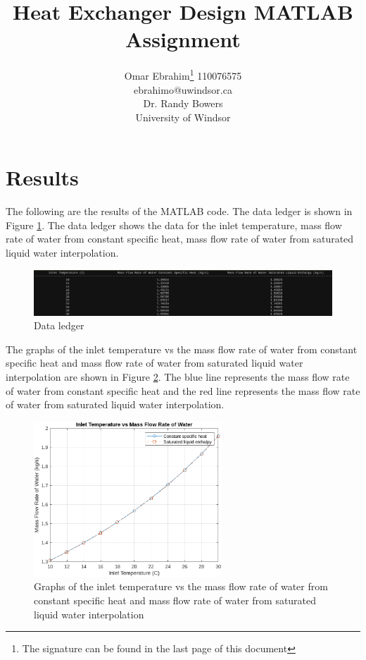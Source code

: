 \documentclass[12pt, titlepage]{article}
\title{Heat Exchanger Design MATLAB Assignment}
\author{Omar Ebrahim\footnote{The signature can be found in the last page of
this document} 110076575\\ebrahimo@uwindsor.ca\\Dr. Randy Bowers\\ University
of Windsor}
\begin{document}
\maketitle
\tableofcontents
\listoffigures
\newpage
\section{Results}
The following are the results of the MATLAB code. The data ledger is shown in
Figure \ref{fig:ledger}. The data ledger shows the data for the inlet temperature,
mass flow rate of water from constant specific heat, mass flow rate of water from
saturated liquid water interpolation.
\begin{figure}[H]
  \centering
  \includegraphics[width=1\textwidth]{../data_ledger.png}
  \caption{Data ledger}
  \label{fig:ledger}
\end{figure}
The graphs of the inlet temperature vs the mass flow rate of water from constant
specific heat and mass flow rate of water from saturated liquid water interpolation
are shown in Figure \ref{fig:graphs}. The blue line represents the mass flow rate
of water from constant specific heat and the red line represents the mass flow
rate of water from saturated liquid water interpolation.
\begin{figure}[H]
  \centering
  \includegraphics[width=0.63\textwidth]{../graph.png}
  \caption{Graphs of the inlet temperature vs the mass flow rate of water from
  constant specific heat and mass flow rate of water from saturated liquid water
  interpolation}
  \label{fig:graphs}
\end{figure}
\end{document}
